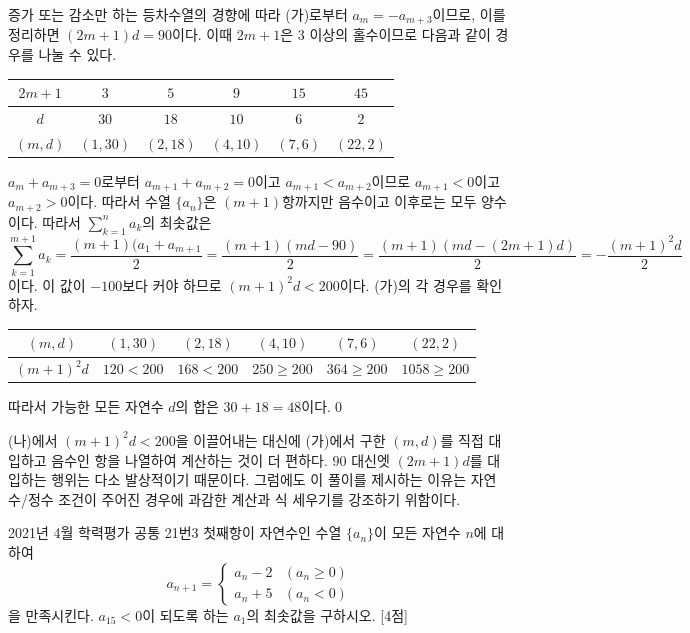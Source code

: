 \documentclass{article}
\begin{document}
\begin{sol}
	증가 또는 감소만 하는 등차수열의 경향에 따라 (가)로부터 $a_m=-a_{m+3}$이므로, 이를 정리하면 $(2m+1)d=90$이다. 이때 $2m+1$은 $3$ 이상의 홀수이므로 다음과 같이 경우를 나눌 수 있다.
	\begin{table}[H]
		\centering
		\begin{tabular}{c|ccccc}
			\toprule
			$2m+1$ & $3$ & $5$ & $9$ & $15$ & $45$ \\
			\midrule
			$d$ & $30$ & $18$ & $10$ & $6$ & $2$ \\
			\midrule
			$(m,d)$ & $(1,30)$ & $(2,18)$ & $(4,10)$ & $(7,6)$ & $(22,2)$  \\
			\bottomrule
		\end{tabular}
	\end{table}
	$a_m+a_{m+3}=0$로부터 $a_{m+1}+a_{m+2}=0$이고 $a_{m+1}<a_{m+2}$이므로 $a_{m+1}<0$이고 $a_{m+2}>0$이다. 따라서 수열 $\{a_n\}$은 $(m+1)$항까지만 음수이고 이후로는 모두 양수이다. 따라서 $\displaystyle\sum_{k=1}^na_k$의 최솟값은
	\[
		\sum_{k=1}^{m+1}a_k=\frac{(m+1)(a_1+a_{m+1}}{2}=\frac{(m+1)(md-90)}{2}=\frac{(m+1)(md-(2m+1)d)}{2}=-\frac{(m+1)^2d}{2}
	\]
	이다. 이 값이 $-100$보다 커야 하므로 $(m+1)^2d<200$이다. (가)의 각 경우를 확인하자.
	\begin{table}[H]
		\centering
		\begin{tabular}{c|ccccc}
			\toprule
			$(m,d)$ & $(1,30)$ & $(2,18)$ & $(4,10)$ & $(7,6)$ & $(22,2)$  \\
			\midrule
			$(m+1)^2d$ & $120<200$ & $168<200$ & $250\geq200$ & $364\geq200$ & $1058\geq200$ \\
			\bottomrule
		\end{tabular}
	\end{table}
	따라서 가능한 모든 자연수 $d$의 합은 $30+18=48$이다.\qed
\end{sol}

\begin{remark}[참고]
	(나)에서 $(m+1)^2d<200$을 이끌어내는 대신에 (가)에서 구한 $(m,d)$를 직접 대입하고 음수인 항을 나열하여 계산하는 것이 더 편하다. $90$ 대신엣 $(2m+1)d$를 대입하는 행위는 다소 발상적이기 때문이다. 그럼에도 이 풀이를 제시하는 이유는 자연수/정수 조건이 주어진 경우에 과감한 계산과 식 세우기를 강조하기 위함이다.
\end{remark}

\newpage
\begin{prob}{2021년 4월 학력평가 공통 21번}{3}
	첫째항이 자연수인 수열 $\{a_n\}$이 모든 자연수 $n$에 대하여
	\[
		a_{n+1}=\begin{cases}
			a_n-2 & (a_n\geq0) \\
			a_n+5 & (a_n<0)
		\end{cases}
	\]
	을 만족시킨다. $a_{15}<0$이 되도록 하는 $a_1$의 최솟값을 구하시오. [4점]
\end{prob}
\end{document}
